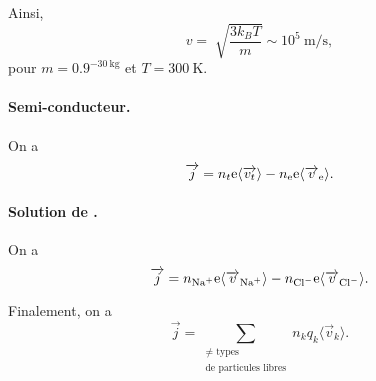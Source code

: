                 Ainsi,
                \begin{equation}
                    v=\sqrt[]{\frac{3k_B T}{m}}\sim 10^{5}~\si{\metre\per\second},
                \end{equation}
                pour $m=0.9^{-30~\si{\kilo\gram}}$ et $T=300~\si{\kelvin}$.

            \paragraph{Semi-conducteur.} 

                On a 
                \begin{equation}
                    \protect\overrightarrow{{j}}=n_t\mathrm{e}\langle \protect\overrightarrow{{v_t}}\rangle-n_{\mathrm{e}}\mathrm{e}\langle\protect\overrightarrow{{v}}_{\mathrm{e}}\rangle.
                \end{equation}

            \paragraph{Solution de .}

                On a 
                \begin{equation}
                    \vec{j}=n_{\ce{Na+}}\rme\langle\vec{v}_{\ce{Na+}}\rangle-n_{\ce{Cl-}}\rme\langle\vec{v}_{\ce{Cl-}}\rangle.
                \end{equation}

            Finalement, on a 
            \begin{equation}
                \boxed{
                    \vec{j}=\sum_{\substack{\neq\text{ types}\\\text{de particules libres}}}n_k q_k\langle \vec{v}_k\rangle.
                }
            \end{equation}